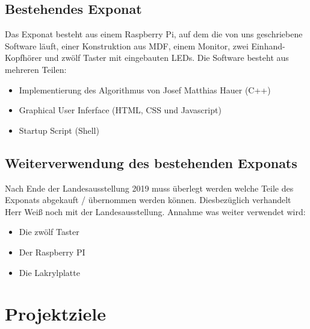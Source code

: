 \documentclass[a4paper]{scrartcl}
\begin{document}
\subsection{Bestehendes Exponat}
Das Exponat besteht aus einem Raspberry Pi, auf dem die von uns geschriebene Software läuft, einer Konstruktion aus MDF, einem Monitor, zwei Einhand-Kopfhörer und zwölf Taster mit eingebauten LEDs.\newline
Die Software besteht aus mehreren Teilen:
\begin{itemize}
	\item Implementierung des Algorithmus von Josef Matthias Hauer (C++)
	\item Graphical User Inferface (HTML, CSS und Javascript)
	\item Startup Script (Shell)
\end{itemize}

\subsection{Weiterverwendung des bestehenden Exponats}
Nach Ende der Landesausstellung 2019 muss überlegt werden welche Teile des Exponats abgekauft / übernommen werden können. Diesbezüglich verhandelt Herr Weiß noch mit der Landesausstellung.
\newline Annahme was weiter verwendet wird:
\begin{itemize}
	\item Die zwölf Taster
	\item Der Raspberry PI
	\item Die Lakrylplatte
\end{itemize}

\section{Projektziele}
\end{document}
